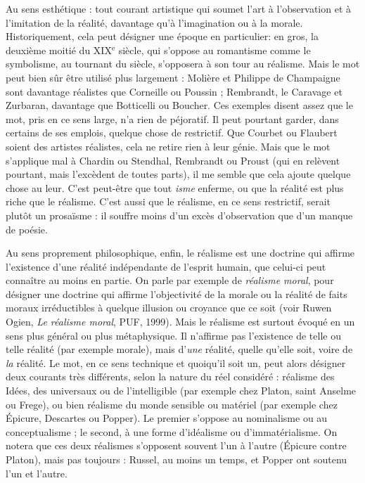 Au sens esthétique : tout courant artistique qui soumet l’art à l'observation
et à l’imitation de la réalité, davantage qu’à l’imagination ou à la morale. Historiquement,
cela peut désigner une époque en particulier: en gros, la
deuxième moitié du {\footnotesize XIX$^\text{e}$} siècle, qui s'oppose au romantisme comme le symbolisme,
au tournant du siècle, s’opposera à son tour au réalisme. Mais le mot
peut bien sûr être utilisé plus largement : Molière et Philippe de Champaigne
sont davantage réalistes que Corneille ou Poussin ; Rembrandt, le Caravage et
Zurbaran, davantage que Botticelli ou Boucher. Ces exemples disent assez que
le mot, pris en ce sens large, n’a rien de péjoratif. Il peut pourtant garder, dans
certains de ses emplois, quelque chose de restrictif. Que Courbet ou Flaubert
soient des artistes réalistes, cela ne retire rien à leur génie. Mais que le mot
s'applique mal à Chardin ou Stendhal, Rembrandt ou Proust (qui en relèvent
pourtant, mais l’excèdent de toutes parts), il me semble que cela ajoute quelque
chose au leur. C’est peut-être que tout {\it isme} enferme, ou que la réalité est plus
riche que le réalisme. C’est aussi que le réalisme, en ce sens restrictif, serait
plutôt un prosaïsme : il souffre moins d’un excès d’observation que d’un
manque de poésie.

Au sens proprement philosophique, enfin, le réalisme est une doctrine qui
affirme l'existence d’une réalité indépendante de l’esprit humain, que celui-ci
peut connaître au moins en partie. On parle par exemple de {\it réalisme moral},
pour désigner une doctrine qui affirme l’objectivité de la morale ou la réalité de
faits moraux irréductibles à quelque illusion ou croyance que ce soit (voir
Ruwen Ogien, {\it Le réalisme moral}, PUF, 1999). Mais le réalisme est surtout
évoqué en un sens plus général ou plus métaphysique. Il n’affirme pas l’existence
de telle ou telle réalité (par exemple morale), mais d’{\it une} réalité, quelle
qu’elle soit, voire de {\it la} réalité. Le mot, en ce sens technique et quoiqu'il soit un,
peut alors désigner deux courants très différents, selon la nature du réel
considéré : réalisme des Idées, des universaux ou de l’intelligible (par exemple
chez Platon, saint Anselme ou Frege), ou bien réalisme du monde sensible ou
matériel (par exemple chez Épicure, Descartes ou Popper). Le premier s'oppose
au nominalisme ou au conceptualisme ; le second, à une forme d’idéalisme ou
d’immatérialisme. On notera que ces deux réalismes s’opposent souvent l’un à
l’autre (Épicure contre Platon), mais pas toujours : Russel, au moins un temps,
et Popper ont soutenu l’un et l’autre.

